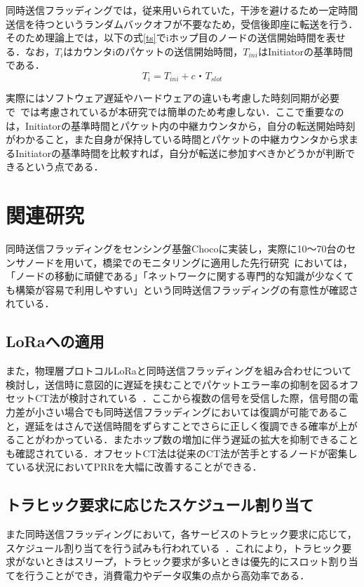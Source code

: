 同時送信フラッディングでは，従来用いられていた，干渉を避けるため一定時間送信を待つというランダムバックオフが不要なため，受信後即座に転送を行う．そのため理論上では，以下の式\ref{ts}でiホップ目のノードの送信開始時間を表せる．なお，$T_i$はカウンタiのパケットの送信開始時間，$T_{ini}$はInitiatorの基準時間である．
\begin{equation}
\label{ts}
T_i=T_{ini}+c・T_{slot}
\end{equation}

実際にはソフトウェア遅延やハードウェアの違いも考慮した時刻同期が必要で~\cite{Effi}では考慮されているが本研究では簡単のため考慮しない．ここで重要なのは，Initiatorの基準時間とパケット内の中継カウンタから，自分の転送開始時刻がわかること，また自身が保持している時間とパケットの中継カウンタから求まるInitiatorの基準時間を比較すれば，自分が転送に参加すべきかどうかが判断できるという点である．



\section{関連研究}
同時送信フラッディングをセンシング基盤Chocoに実装し，実際に10～70台のセンサノードを用いて，橋梁でのモニタリングに適用した先行研究~\cite{monitoring}においては，「ノードの移動に頑健である」「ネットワークに関する専門的な知識が少なくても構築が容易で利用しやすい」という同時送信フラッディングの有意性が確認されている．

\subsection*{LoRaへの適用}
また，物理層プロトコルLoRaと同時送信フラッディングを組み合わせについて検討し，送信時に意図的に遅延を挟むことでパケットエラー率の抑制を図るオフセットCT法が検討されている~\cite{LoRa}．ここから複数の信号を受信した際，信号間の電力差が小さい場合でも同時送信フラッディングにおいては復調が可能であること，遅延をはさんで送信時間をずらすことでさらに正しく復調できる確率が上がることがわかっている．またホップ数の増加に伴う遅延の拡大を抑制できることも確認されている．オフセットCT法は従来のCT法が苦手とするノードが密集している状況においてPRRを大幅に改善することができる．

\subsection*{トラヒック要求に応じたスケジュール割り当て}
また同時送信フラッディングにおいて，各サービスのトラヒック要求に応じて，スケジュール割り当てを行う試みも行われている~\cite{monitoring}．これにより，トラヒック要求がないときはスリープ，トラヒック要求が多いときは優先的にスロット割り当てを行うことができ，消費電力やデータ収集の点から高効率である．
